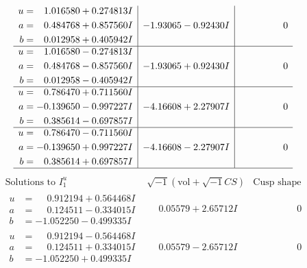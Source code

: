 \documentclass[1p]{elsarticle_modified}
\theoremstyle{definition}
\newcommand{\I}{\sqrt{-1}}
\begin{document}
$$\begin{array}{c|c|c}
\begin{aligned}
u &= \phantom{-}1.016580 + 0.274813 I \\
a &= \phantom{-}0.484768 + 0.857560 I \\
b &= \phantom{-}0.012958 + 0.405942 I\end{aligned}
 & -1.93065 - 0.92430 I & \phantom{-0.000000 } 0 \\ \hline\begin{aligned}
u &= \phantom{-}1.016580 - 0.274813 I \\
a &= \phantom{-}0.484768 - 0.857560 I \\
b &= \phantom{-}0.012958 - 0.405942 I\end{aligned}
 & -1.93065 + 0.92430 I & \phantom{-0.000000 } 0 \\ \hline\begin{aligned}
u &= \phantom{-}0.786470 + 0.711560 I \\
a &= -0.139650 - 0.997227 I \\
b &= \phantom{-}0.385614 - 0.697857 I\end{aligned}
 & -4.16608 + 2.27907 I & \phantom{-0.000000 } 0 \\ \hline\begin{aligned}
u &= \phantom{-}0.786470 - 0.711560 I \\
a &= -0.139650 + 0.997227 I \\
b &= \phantom{-}0.385614 + 0.697857 I\end{aligned}
 & -4.16608 - 2.27907 I & \phantom{-0.000000 } 0\\
 \hline 
 \end{array}$$\newpage$$\begin{array}{c|c|c}  
\text{Solutions to }I^u_{1}& \I (\text{vol} + \sqrt{-1}CS) & \text{Cusp shape}\\
 \hline 
\begin{aligned}
u &= \phantom{-}0.912194 + 0.564468 I \\
a &= \phantom{-}0.124511 - 0.334015 I \\
b &= -1.052250 - 0.499335 I\end{aligned}
 & \phantom{-}0.05579 + 2.65712 I & \phantom{-0.000000 } 0 \\ \hline\begin{aligned}
u &= \phantom{-}0.912194 - 0.564468 I \\
a &= \phantom{-}0.124511 + 0.334015 I \\
b &= -1.052250 + 0.499335 I\end{aligned}
 & \phantom{-}0.05579 - 2.65712 I & \phantom{-0.000000 } 0 \\ \hline\begin{aligned}

\end{aligned}
\end{array}$$
\end{document}

